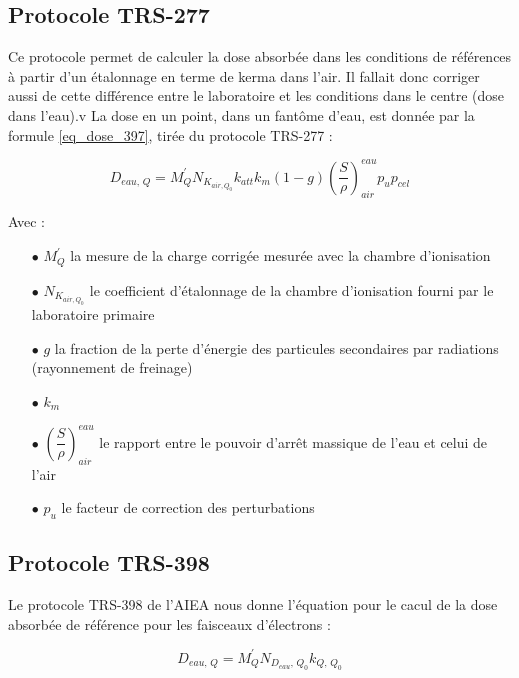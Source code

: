 \documentclass{article}
\begin{document}
\subsection{Protocole TRS-277}

Ce protocole permet de calculer la dose absorbée dans les conditions de références à partir d'un étalonnage en terme de kerma dans l'air. Il fallait donc corriger aussi de cette différence entre le laboratoire et les conditions dans le centre (dose dans l'eau).v La dose en un point, dans un fantôme d'eau, est donnée par la formule \ref*{eq_dose_397}, tirée du protocole TRS-277 :

\begin{equation}
  D_{eau,\, Q} = M_Q^{'} N_{K_{air, Q_0}} k_{att} k_m (1-g) \left( \dfrac{S}{\rho} \right)^{eau}_{air} p_u p_{cel}
  \label{eq_dose_397}
\end{equation}

Avec :

\begin{itemize}
  \item[$\bullet$] $M_Q^{'}$ la mesure de la charge corrigée mesurée avec la chambre d'ionisation 
  \item[$\bullet$] $N_{K_{air, Q_0}}$ le coefficient d'étalonnage de la chambre d'ionisation fourni par le laboratoire primaire
  \item[$\bullet$] $g$ la fraction de la perte d'énergie des particules secondaires par radiations (rayonnement de freinage)
  \item[$\bullet$] $k_m$ 
  \item[$\bullet$] $\left( \dfrac{S}{\rho} \right)^{eau}_{air}$ le rapport entre le pouvoir d'arrêt massique de l'eau et celui de l'air
  \item[$\bullet$] $p_u$ le facteur de correction des perturbations
\end{itemize}

\subsection{Protocole TRS-398}

Le protocole TRS-398 de l'AIEA \cite{international2001iaea} nous donne l'équation pour le cacul de la dose absorbée de référence pour les faisceaux d'électrons :

\begin{equation}
  D_{eau, \, Q} = M_Q^{'} N_{D_{eau}, \, Q_0} k_{Q,\, Q_0}
  \label{eq_dose_398}
\end{equation}
\end{document}
